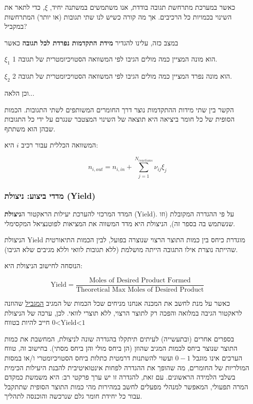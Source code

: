\documentclass[
  hebrew,
  letterpaper,
  DIV=11,
  numbers=noendperiod]{scrreprt}
\begin{document}
כאשר במערכת מתרחשת תגובה בודדת, אנו משתמשים במשתנה יחיד, \(\xi\), כדי
לתאר את השינוי בכמויות כל הרכיבים. אך מה קורה כשיש לנו שתי תגובות (או
יותר) המתרחשות במקביל?

במצב כזה, עלינו להגדיר \textbf{מידת התקדמות נפרדת לכל תגובה} כאשר

\(\xi_{1}\) הוא מונה המציין כמה מולים הגיבו לפי המשוואה הסטויכיומטרית של
תגובה 1.

\(\xi_{2}\) הוא מונה נפרד המציין כמה מולים הגיבו לפי המשוואה
הסטויכיומטרית של תגובה 2.

וכן הלאה...

הקשר בין שתי מידות ההתקדמות נוצר דרך החומרים המשותפים לשתי התגובות.
הכמות הסופית של כל חומר ביציאה היא תוצאה של השינוי המצטבר שנגרם על ידי
כל התגובות שבהן הוא משתתף.

המשוואה הכללית עבור רכיב \(i\) היא:

\[n_{i,out} = n_{i,in} + \sum_{j = 1}^{N_{reactions}}{\nu_{ij}\xi_{j}}\]

\subsubsection{מדדי ביצוע: ניצולת
(Yield)}\label{ux5deux5d3ux5d3ux5d9-ux5d1ux5d9ux5e6ux5d5ux5e2-ux5e0ux5d9ux5e6ux5d5ux5dcux5ea-yield}

המדד המרכזי להערכת יעילות הראקטור ה\textbf{ניצולת} (Yield). על פי ההגדרה
המקובלת (וזו שנשתמש בה בספר זה), הניצולת היא מדד המשווה את המציאות
לפוטנציאל המקסימלי.

הניצולת Yield מוגדרת כיחס בין כמות התוצר הרצוי שנוצרה בפועל, לבין הכמות
התיאורטית שהייתה נוצרת אילו התגובה הייתה מושלמת (ללא תגובות לוואי וללא
מגיבים שלא הגיבו).

הנוסחה לחישוב הניצולת היא:

\[\text{Yield} = \frac{\text{Moles of Desired Product Formed}}{\text{Theoretical Max Moles of Desired Product}}\]

כאשר על מנת לחשב את המכנה אנחנו מניחים שכל הכמות של המגיב \ul{המגביל}
שהוזנה לראקטור הגיבה במלואה והפכה רק לתוצר הרצוי, ללא תוצרי לוואי. לכן,
ערכה של הניצולת חייב להיות בטווח \(\text{0<Yield<1}\)

בספרים אחרים (ובתעשייה) לעיתים תיתקלו בהגדרה שונה לניצולת, המחשבת את
כמות התוצר שנוצר ביחס לכמות המגיב שהוזן (הן ביחס מולי והן ביחס מסתי).
בחישוב זה, טווח הערכים אינו מוגבל \(0 - 1\) ועשוי להשתנות דרמטית כתלות
ביחס הסטויכיומטרי ו/או במסות המולריות של החומרים, מה שהופך את ההגדרה
לפחות אינטואיטיבית להבנת היעילות הכימית בשלבי הלמידה הראשונים. עם זאת,
להגדרה זו יש ערך פרקטי רב: היא משמשת כ\textquotesingle מקדם
המרה\textquotesingle{} תפעולי, המאפשר למנהלי מפעלים לחשב במהירות מהי
כמות התוצר הסופית שתתקבל עבור כל יחידת חומר גלם שנרכשה והוכנסה לתהליך.
\end{document}
